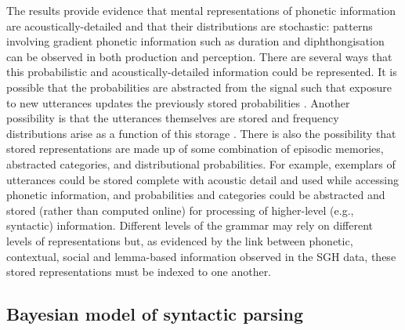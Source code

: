 The results provide evidence that mental representations of phonetic information are acoustically-detailed and that their distributions are stochastic: patterns involving gradient phonetic information such as duration and diphthongisation can be observed in both production and perception.  There are several ways that this probabilistic and acoustically-detailed information could be represented.  It is possible that the probabilities are abstracted from the signal such that exposure to new utterances updates the previously stored probabilities \citep{norrismcqueen2008}.  Another possibility is that the utterances themselves are stored and frequency distributions arise as a function of this storage \citep{pierrehumbert2001}.  There is also the possibility that stored representations are made up of some combination of episodic memories, abstracted categories, and distributional probabilities.  For example, exemplars of utterances could be stored complete with acoustic detail and used while accessing phonetic information, and probabilities and categories could be abstracted and stored (rather than computed online) for processing of higher-level (e.g., syntactic) information.  Different levels of the grammar may rely on different levels of representations but, as evidenced by the link between phonetic, contextual, social and lemma-based information observed in the SGH data, these stored representations must be indexed to one another.  



\subsection{Bayesian model of syntactic parsing}
  
